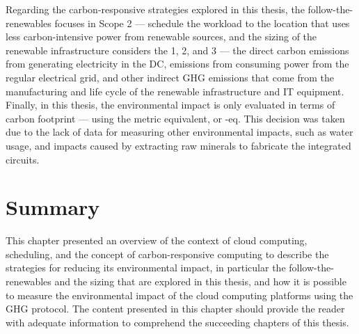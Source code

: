 Regarding the carbon-responsive strategies explored in this thesis, the follow-the-renewables focuses in Scope 2 --- schedule the workload to the location that uses less carbon-intensive power from renewable sources, and the sizing of the renewable infrastructure considers the  1, 2, and 3 --- the direct carbon emissions from generating electricity in the DC, emissions from consuming power from the regular electrical grid, and other indirect GHG emissions that come from the manufacturing and life cycle of the renewable infrastructure and IT equipment. Finally, in this thesis, the environmental impact is only evaluated in terms of carbon footprint --- using the metric  equivalent, or -eq. This decision was taken due to the lack of data for measuring other environmental impacts, such as water usage, and impacts caused by extracting raw minerals to fabricate the integrated circuits.

\section{Summary}

This chapter presented an overview of the context of cloud computing, scheduling, and the concept of carbon-responsive computing to describe the strategies for reducing its environmental impact, in particular the follow-the-renewables and the sizing that are explored in this thesis, and how it is possible to measure the environmental impact of the cloud computing platforms using the GHG protocol. The content presented in this chapter should provide the reader with adequate information to comprehend the succeeding chapters of this thesis.
